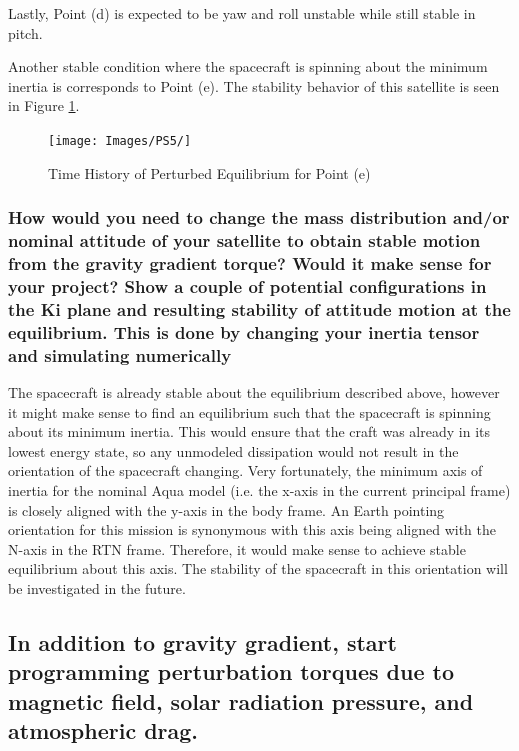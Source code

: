 Lastly, Point (d) is expected to be yaw and roll unstable while still stable in pitch.

Another stable condition where the spacecraft is spinning about the minimum inertia is corresponds to Point (e). The stability behavior of this satellite is seen in Figure \ref{fig:point_e_grav_stability}.

\begin{figure}[H]
    \centering
    \captionsetup{justification = centering}
    \texttt{[image: Images/PS5/]}
    \caption{Time History of Perturbed Equilibrium for Point (e)}
    \label{fig:point_e_grav_stability}
\end{figure}

\subsubsection{How would you need to change the mass distribution and/or nominal attitude of your satellite to obtain stable motion from the gravity gradient torque? Would it make sense for your project? Show a couple of potential configurations in the Ki plane and resulting stability of attitude motion at the equilibrium. This is done by changing your inertia tensor and simulating numerically}

The spacecraft is already stable about the equilibrium described above, however it might make sense to find an equilibrium such that the spacecraft is spinning about its minimum inertia. This would ensure that the craft was already in its lowest energy state, so any unmodeled dissipation would not result in the orientation of the spacecraft changing. Very fortunately, the minimum axis of inertia for the nominal Aqua model (i.e. the x-axis in the current principal frame) is closely aligned with the y-axis in the body frame. An Earth pointing orientation for this mission is synonymous with this axis being aligned with the N-axis in the RTN frame. Therefore, it would make sense to achieve stable equilibrium about this axis. The stability of the spacecraft in this orientation will be investigated in the future.

\subsection{In addition to gravity gradient, start programming perturbation torques due to magnetic field, solar radiation pressure, and atmospheric drag.}

